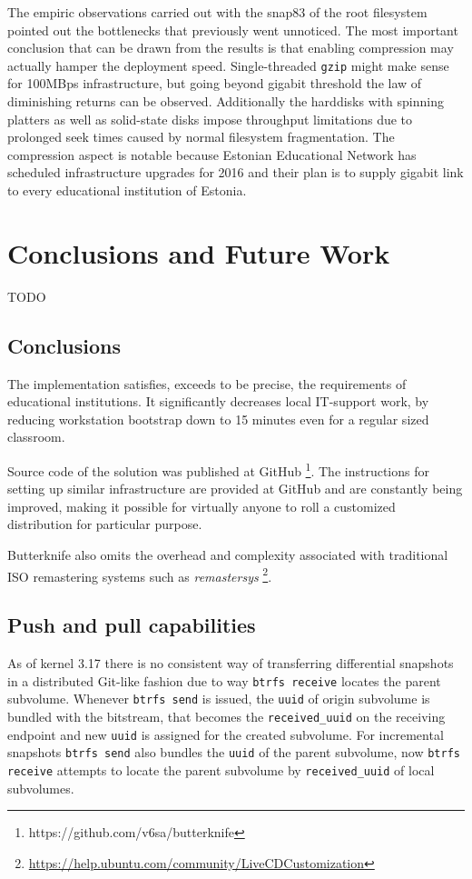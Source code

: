\documentclass[a4paper,11pt]{kth-mag}
\begin{document}
The empiric observations carried out with
the snap83 of the root filesystem  pointed out
the bottlenecks that previously went unnoticed.
The most important conclusion that can be drawn from the 
results is that enabling compression may actually hamper the
deployment speed.
Single-threaded \texttt{gzip} might make sense for 100MBps infrastructure,
but going beyond gigabit threshold the law of diminishing returns can be observed.
Additionally the harddisks with spinning platters
as well as solid-state disks impose throughput
limitations due to prolonged seek times
caused by normal filesystem fragmentation. 
The compression aspect is notable because
Estonian Educational Network has scheduled infrastructure
upgrades for 2016 and their plan is to supply
gigabit link to every educational institution of Estonia.


%
%
%
%
\chapter{Conclusions and Future Work}
\label{chap:conc}

TODO



\section{Conclusions}

The implementation satisfies, exceeds to be precise,
the requirements of educational institutions.
It significantly decreases local IT-support work,
by reducing workstation bootstrap down to 15 minutes even for
a regular sized classroom.

Source code of the solution was published at GitHub
\footnote{https://github.com/v6sa/butterknife}.
The instructions for setting up similar infrastructure
are provided at GitHub and are constantly being improved,
making it possible for virtually anyone
to roll a customized distribution
for particular purpose.

Butterknife also omits the overhead
and complexity associated with traditional
ISO remastering systems such as \emph{remastersys}
\footnote{\url{https://help.ubuntu.com/community/LiveCDCustomization}}.


\section{Push and pull capabilities}

As of kernel 3.17 there is no consistent way of transferring
differential snapshots in a distributed Git-like fashion due to way
\texttt{btrfs receive} locates the parent subvolume.
Whenever \texttt{btrfs send} is issued, the \texttt{uuid} of origin
subvolume is bundled with the bitstream, that becomes
the \texttt{received\_uuid} on the receiving endpoint and
new \texttt{uuid} is assigned for the created subvolume.
For incremental snapshots \texttt{btrfs send} also bundles
the \texttt{uuid} of the parent subvolume,
now \texttt{btrfs receive} attempts to locate the parent
subvolume by \texttt{received\_uuid} of local subvolumes.
\end{document}

